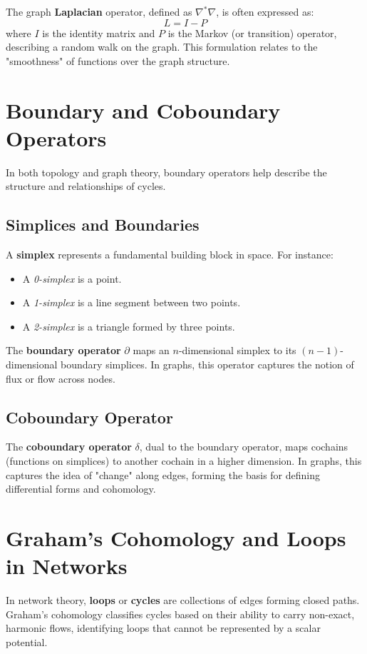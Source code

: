 \documentclass[10pt,a4paper,twocolumn]{article}
\begin{document}
	The graph \textbf{Laplacian} operator, defined as \( \nabla^* \nabla \), is often expressed as:
	\[
	L = I - P
	\]
	where \( I \) is the identity matrix and \( P \) is the Markov (or transition) operator, describing a random walk on the graph. This formulation relates to the "smoothness" of functions over the graph structure.
	
	\section{Boundary and Coboundary Operators}
	In both topology and graph theory, boundary operators help describe the structure and relationships of cycles.
	
	\subsection{Simplices and Boundaries}
	A \textbf{simplex} represents a fundamental building block in space. For instance:
	\begin{itemize}
		\item A \textit{0-simplex} is a point.
		\item A \textit{1-simplex} is a line segment between two points.
		\item A \textit{2-simplex} is a triangle formed by three points.
	\end{itemize}
	
	The \textbf{boundary operator} \( \partial \) maps an \( n \)-dimensional simplex to its \((n-1)\)-dimensional boundary simplices. In graphs, this operator captures the notion of flux or flow across nodes.
	
	\subsection{Coboundary Operator}
	The \textbf{coboundary operator} \( \delta \), dual to the boundary operator, maps cochains (functions on simplices) to another cochain in a higher dimension. In graphs, this captures the idea of "change" along edges, forming the basis for defining differential forms and cohomology.
	
	\section{Graham's Cohomology and Loops in Networks}
	In network theory, \textbf{loops} or \textbf{cycles} are collections of edges forming closed paths. Graham's cohomology classifies cycles based on their ability to carry non-exact, harmonic flows, identifying loops that cannot be represented by a scalar potential.
	
\end{document}
